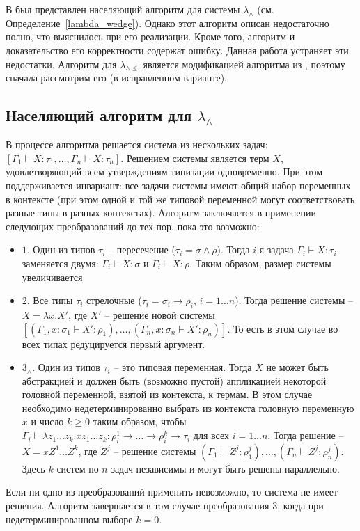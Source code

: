 \documentclass[../main.tex]{subfiles}
\begin{document}
 \label{sec:the_algorithm}

В \cite{kusmierek_2007} был представлен населяющий алгоритм для системы $\lambda_\wedge$ (см. Определение~\ref{lambda_wedge}). Однако этот  алгоритм описан недостаточно полно, что выяснилось при его реализации. Кроме того, алгоритм и доказательство его корректности содержат ошибку. Данная работа устраняет эти недостатки. Алгоритм для $\lambda_{\wedge \leqslant}$ является модификацией алгоритма из \cite{kusmierek_2007}, поэтому сначала рассмотрим его (в исправленном варианте).


\subsection{Населяющий алгоритм для $\lambda_\wedge$}

\begin{algorithm} \label{алгоритм без эты}

В процессе алгоритма решается система из нескольких задач: $[\Gamma_1 \vdash X : \tau_1 ,\dots, \Gamma_n \vdash X : \tau_n]$. Решением системы является терм $X$, удовлетворяющий всем утверждениям типизации одновременно. При этом поддерживается инвариант: все задачи системы имеют общий набор переменных в контексте (при этом одной и той же типовой переменной могут соответствовать разные типы в разных контекстах). Алгоритм заключается в применении следующих преобразований до тех пор, пока это возможно:
\begin{itemize}
    \item $1$. Один из типов $\tau_i$ -- пересечение ($\tau_i = \sigma \wedge \rho$). Тогда $i$-я задача $\Gamma_i \vdash X : \tau_i$ заменяется двумя:  $\Gamma_i \vdash X : \sigma$ и $\Gamma_i \vdash X : \rho$. Таким образом, размер системы увеличивается
     \item $2$. Все типы $\tau_i$ стрелочные  ($\tau_i = \sigma_i \to \rho_i$, $i = 1 \dots n$). Тогда решение системы --  $X = \lambda x.X'$, где $X'$ -- решение новой системы  $[(\Gamma_1, x:\sigma_1 \vdash X' : \rho_1) ,\dots, (\Gamma_n, x:\sigma_n \vdash X' : \rho_n)]$. То есть в этом случае во всех типах редуцируется первый аргумент. 
     \item $3_{\wedge}$. Один из типов $\tau_i$ -- это типовая переменная. Тогда $X$ не может быть абстракцией и должен быть (возможно пустой) аппликацией некоторой головной переменной, взятой из контекста, к термам. В этом случае необходимо недетерминированно выбрать из контекста головную переменную $x$ и число $k \geqslant 0$ таким образом, чтобы  $\Gamma_i \vdash \lambda z_1 \dots z_k . x z_1 \dots z_k : \rho_i^1 \to \dots \to \rho_i^k \to \tau_i$ для всех $i = 1 \dots n$. Тогда решение --  $X = x Z^1 \dots Z^k$, где $Z^j$ -- решение системы $(\Gamma_1 \vdash Z^j : \rho_1^j) ,\dots, (\Gamma_n \vdash Z^j : \rho_n^j)$. Здесь $k$ систем по $n$ задач независимы и могут быть решены параллельно.
\end{itemize}

Если ни одно из преобразований применить невозможно, то система не имеет решения. 
Алгоритм завершается в том случае преобразования $3$, когда при недетерминированном выборе $k = 0$.
    
\end{algorithm}
\end{document}
